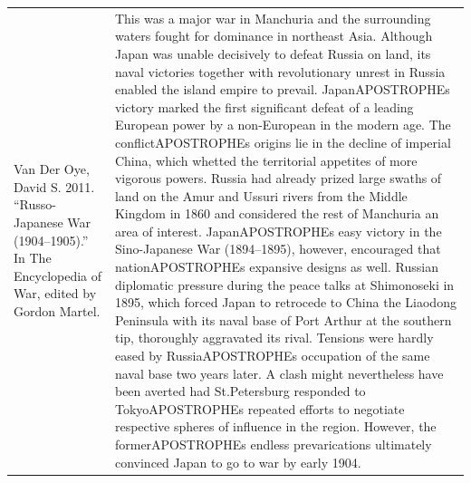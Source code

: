 {\begin{longtable}{p{}p{}}
Van Der Oye, David S. 2011. “Russo-Japanese War (1904–1905).” In The Encyclopedia of War, edited by Gordon Martel. & This was a major war in Manchuria and the surrounding waters fought for dominance in northeast Asia. Although Japan was unable decisively to defeat Russia on land, its naval victories together with revolutionary unrest in Russia enabled the island empire to prevail. JapanAPOSTROPHEs victory marked the first significant defeat of a leading European power by a non-European in the modern age. The conflictAPOSTROPHEs origins lie in the decline of imperial China, which whetted the territorial appetites of more vigorous powers. Russia had already prized large swaths of land on the Amur and Ussuri rivers from the Middle Kingdom in 1860 and considered the rest of Manchuria an area of interest. JapanAPOSTROPHEs easy victory in the Sino-Japanese War (1894–1895), however, encouraged that nationAPOSTROPHEs expansive designs as well.  Russian diplomatic pressure during the peace talks at Shimonoseki in 1895, which forced Japan to retrocede to China the Liaodong Peninsula with its naval base of Port Arthur at the southern tip, thoroughly aggravated its rival. Tensions were hardly eased by RussiaAPOSTROPHEs occupation of the same naval base two years later. A clash might nevertheless have been averted had St.Petersburg responded to TokyoAPOSTROPHEs repeated efforts to negotiate respective spheres of influence in the region. However, the formerAPOSTROPHEs endless prevarications ultimately convinced Japan to go to war by early 1904.
\\

\end{longtable}}
